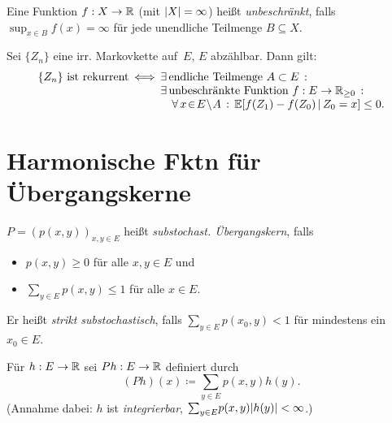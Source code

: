\documentclass{cheat-sheet}
\newcommand{\E}{\mathbb{E}} %
\begin{document}
\begin{defn}
  Eine Funktion $f : X \to \mathbb{R}$ (mit $\lvert X\rvert = \infty$) heißt \emph{unbeschränkt}, falls ${\sup}_{x \in B} f(x) = \infty$ für jede unendliche Teilmenge $B \subseteq X$.
\end{defn}

\begin{satz}
  Sei $\{ Z_n \}$ eine irr. Markovkette auf~$E$, $E$ abzählbar.
  Dann gilt:
  \[
    \arraycolsep=1pt
    \begin{array}{r c l}
      \{ Z_n \} \text{ ist rekurrent}
      &\iff&
      \ex{\text{endliche Teilmenge } A \subset E} \\
      && \ex{\text{unbeschränkte Funktion } f : E \to \R_{\geq 0}} \\
      && \quad \fa{x \!\in\! E \!\setminus\! A} \E[ f(Z_1) - f(Z_0) \,|\, Z_0 = x ] \leq 0.
    \end{array}
  \]
\end{satz}

\section{Harmonische Fktn für Übergangskerne}


\begin{defn}
  $P = (p(x, y))_{x, y \in E}$ heißt \emph{substochast. Übergangskern}, falls
  \begin{itemize}
    \item $p(x, y) \geq 0$ für alle $x, y \in E$ und
    \item ${\sum}_{y \in E} p(x, y) \leq 1$ für alle $x \in E$.
  \end{itemize}
  Er heißt \textit{strikt substochastisch}, falls ${\sum}_{y \in E} p(x_0, y) < 1$ für mindestens ein $x_0 \in E$.
\end{defn}

\begin{nota}
  Für $h : E \to \mathbb{R}$ sei $P h : E \to \mathbb{R}$ definiert durch
  \[
    (P h)(x) \coloneqq {\sum}_{y \in E} p(x, y) h(y).
  \]
  (Annahme dabei: $h$ ist \textit{integrierbar}, \dh{} ${\sum}_{y \in E} p(x, y) \abs{h(y)} < \infty$.) \\
\end{nota}
\end{document}

